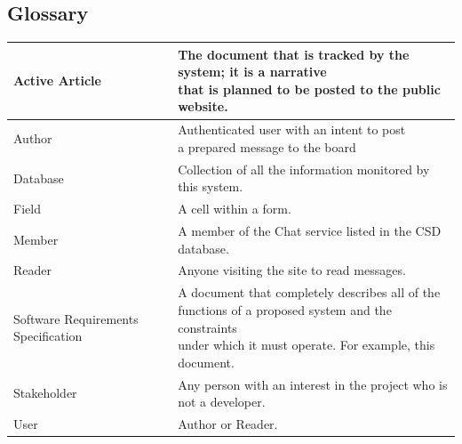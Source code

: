 \documentclass[12pt]{article}
\begin{document}
	\subsection{Glossary}
	\begin{table}[H]
		\begin{tabularx}{1.055\textwidth}{|l|l|}
			\firsthline
			Active Article& \makecell{The document that is tracked by the system; it is a narrative \\that is planned to be posted to the public website.} \\
			\hline
			Author & \makecell{Authenticated user with an intent to post \\a prepared message to the board} \\ \hline
			Database&
			Collection of all the information monitored by this system.\\ \hline
			Field&
			A cell within a form.\\ \hline
			Member&
			A member of the Chat service listed in the CSD database.\\ \hline
			Reader&
			Anyone visiting the site to read messages. \\ \hline
			Software Requirements Specification &
			\makecell{A document that completely describes all of the \\functions of a proposed system and the constraints \\under which it must operate. For example, this document.}\\ \hline
			Stakeholder&
			\makecell{Any person with an interest in the project who is \\not a developer.} \\ \hline
			User &
			Author or Reader.\\
			\hline
		\end{tabularx}
	\end{table}
\end{document}
